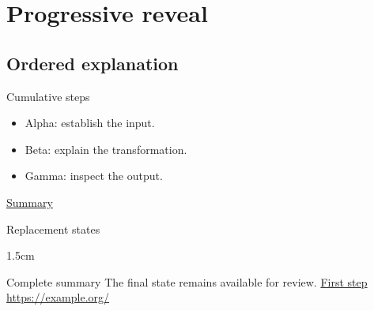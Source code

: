 \section{Progressive reveal}
\subsection{Ordered explanation}
\begin{frame}[label=overlay-list]{Cumulative steps}
  \begin{itemize}
    \item<1-> Alpha: establish the input.
    \item<2-> Beta: explain the transformation.
    \item<3-> Gamma: inspect the output.
  \end{itemize}
  \hyperlink{overlay-summary}{Summary}
\end{frame}
\begin{frame}{Replacement states}
  \begin{overlayarea}{\textwidth}{1.5cm}
  \end{overlayarea}
\end{frame}
\begin{frame}[label=overlay-summary]{Complete summary}
  The final state remains available for review.
  \hyperlink{overlay-list}{First step}
  \url{https://example.org/}
\end{frame}
